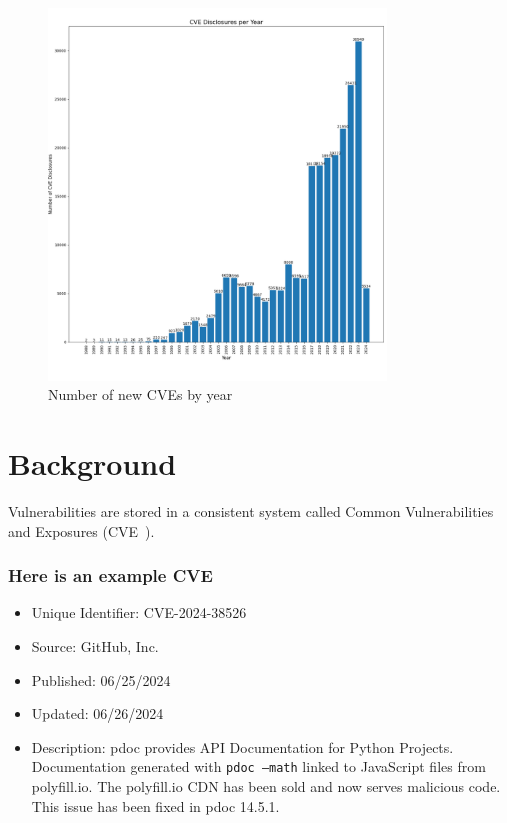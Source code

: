 \documentclass[12pt]{article}
\begin{document}
\begin{figure}[ht] \centering
	\includegraphics[width=0.8\textwidth]{figures/cves_year.pdf}
	\caption{\label{fig:cves_per_year}Number of new CVEs by year}
\end{figure}


\section{Background}

Vulnerabilities are stored in a consistent system called Common Vulnerabilities and
Exposures (CVE~\cite{CVE}).

\subsubsection*{Here is an example CVE}
\begin{itemize}

	\item   Unique Identifier: CVE-2024-38526

	\item   Source: GitHub, Inc.

	\item   Published: 06/25/2024

	\item   Updated: 06/26/2024

	\item   Description: pdoc provides API Documentation for Python Projects. Documentation
	      generated with \texttt{pdoc --math} linked to JavaScript files from polyfill.io. The polyfill.io
	      CDN has been sold and now serves malicious code. This issue has been fixed in pdoc 14.5.1.

\end{itemize}
\end{document}
